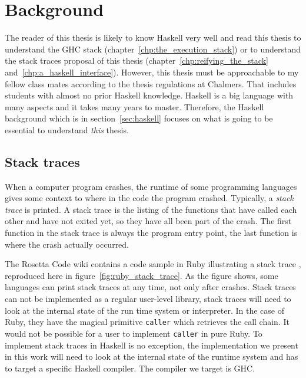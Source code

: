 \chapter{Background}

The reader of this thesis is likely to know Haskell very well
and read this thesis to understand the GHC stack (chapter~\ref{chp:the_execution_stack}) or to understand the stack traces
proposal of this thesis (chapter~\ref{chp:reifying_the_stack}
and~\ref{chp:a_haskell_interface}). However, this thesis must be
approachable to my fellow class mates according to the thesis
regulations at Chalmers. That includes students with almost no prior
Haskell knowledge. Haskell is a big language with many aspects and it
takes many years to master. Therefore, the Haskell background which is
in section~\ref{sec:haskell} focuses on what is going to be essential to
understand \emph{this} thesis.

\section{Stack traces}

When a computer program crashes, the runtime of some programming languages
gives some context to where in the code the program crashed.
Typically, a \emph{stack trace} is printed. A stack trace is the listing
of the functions that have called each other and have not exited yet, so
they have all been part of the crash. The first function in the stack
trace is always the program entry point, the last function is where the
crash actually occurred.

The Rosetta Code wiki contains a code sample in Ruby illustrating a stack
trace \cite{rosetta_stone_st}, reproduced here in figure~\ref{fig:ruby_stack_trace}. As the figure shows, some languages can print stack
traces at any time, not only after crashes. Stack traces can not be
implemented as a regular user-level library, stack traces will need
to look at the internal state of the run time system or interpreter.
In the case of Ruby, they have the magical primitive \texttt{caller} which
retrieves the call chain. It would not be possible for a user
to implement \texttt{caller} in pure Ruby. To implement stack traces
in Haskell is no exception, the implementation we present in this work
will need to look at the internal state of the runtime system and has to
target a specific Haskell compiler. The compiler we target is GHC.

